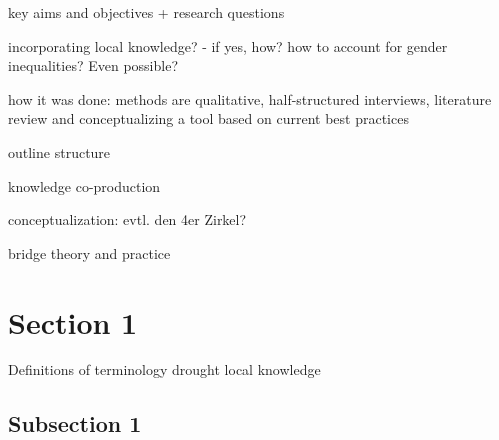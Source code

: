 

key aims and objectives + research questions

incorporating local knowledge? - if yes, how?
how to account for gender inequalities? Even possible?




how it was done: methods are qualitative, half-structured interviews, literature review and conceptualizing a tool based on current best practices

outline structure

knowledge co-production
\autocite{dasInteractiveInformationCrowdsourcing2016}

conceptualization: evtl. den 4er Zirkel?

bridge theory and practice
\section{Section 1}
Definitions of terminology
drought
local knowledge
\subsection{Subsection 1}


